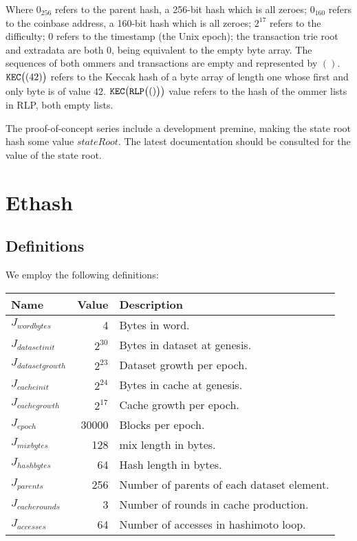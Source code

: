 \documentclass[9pt,oneside]{amsart}
\begin{document}
Where $0_{256}$ refers to the parent hash, a 256-bit hash which is all zeroes; $0_{160}$ refers to the coinbase address, a 160-bit hash which is all zeroes; $2^{17}$ refers to the difficulty; 0 refers to the timestamp (the Unix epoch); the transaction trie root and extradata are both $0$, being equivalent to the empty byte array. The sequences of both ommers and transactions are empty and represented by $()$. $\mathtt{\tiny KEC}\big( (42) \big)$ refers to the Keccak hash of a byte array of length one whose first and only byte is of value 42. $\mathtt{\tiny KEC}\big(\mathtt{\tiny RLP}\big( () \big)\big)$ value refers to the hash of the ommer lists in RLP, both empty lists.

The proof-of-concept series include a development premine, making the state root hash some value $stateRoot$. The latest documentation should be consulted for the value of the state root.

\section{Ethash}\label{app:ethash}
\subsection{Definitions}
We employ the following definitions:

\begin{tabular*}{\columnwidth}[h]{lrl}
\toprule
Name & Value & Description \\
\midrule
$J_{wordbytes}$ & 4  & Bytes in word. \\
$J_{datasetinit}$ & $2^{30}$ & Bytes in dataset at genesis. \\
$J_{datasetgrowth}$ & $2^{23}$ & Dataset growth per epoch. \\
$J_{cacheinit}$ & $2^{24}$ & Bytes in cache at genesis. \\
$J_{cachegrowth}$ & $2^{17}$ & Cache growth per epoch. \\
$J_{epoch}$ & 30000 & Blocks per epoch. \\
$J_{mixbytes}$ & 128 & mix length in bytes. \\
$J_{hashbytes}$ & 64 & Hash length in bytes. \\
$J_{parents}$ & 256 & Number of parents of each dataset element. \\
$J_{cacherounds}$ & 3 & Number of rounds in cache production. \\
$J_{accesses}$ & 64 & Number of accesses in hashimoto loop. \\
\bottomrule
\end{tabular*}
\end{document}
